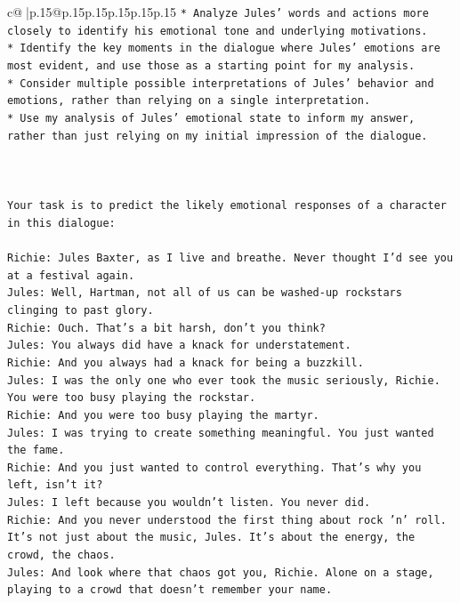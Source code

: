 \documentclass{article}
\begin{document}
{\begin{supertabular}{c@{$\;$}|p{.15\linewidth}@{}p{.15\linewidth}p{.15\linewidth}p{.15\linewidth}p{.15\linewidth}p{.15\linewidth}}
{{{\texttt{* Analyze Jules' words and actions more closely to identify his emotional tone and underlying motivations.} \\
\texttt{* Identify the key moments in the dialogue where Jules' emotions are most evident, and use those as a starting point for my analysis.} \\
\texttt{* Consider multiple possible interpretations of Jules' behavior and emotions, rather than relying on a single interpretation.} \\
\texttt{* Use my analysis of Jules' emotional state to inform my answer, rather than just relying on my initial impression of the dialogue.} \\
\\ 
\\ 
\\ 
\texttt{Your task is to predict the likely emotional responses of a character in this dialogue:} \\
\\ 
\texttt{Richie: Jules Baxter, as I live and breathe. Never thought I'd see you at a festival again.} \\
\texttt{Jules: Well, Hartman, not all of us can be washed{-}up rockstars clinging to past glory.} \\
\texttt{Richie: Ouch. That's a bit harsh, don't you think?} \\
\texttt{Jules: You always did have a knack for understatement.} \\
\texttt{Richie: And you always had a knack for being a buzzkill. } \\
\texttt{Jules: I was the only one who ever took the music seriously, Richie. You were too busy playing the rockstar.} \\
\texttt{Richie: And you were too busy playing the martyr. } \\
\texttt{Jules: I was trying to create something meaningful. You just wanted the fame.} \\
\texttt{Richie: And you just wanted to control everything. That's why you left, isn't it?} \\
\texttt{Jules: I left because you wouldn’t listen. You never did.} \\
\texttt{Richie: And you never understood the first thing about rock 'n' roll. It's not just about the music, Jules. It's about the energy, the crowd, the chaos.} \\
\texttt{Jules: And look where that chaos got you, Richie. Alone on a stage, playing to a crowd that doesn't remember your name.} \\
}}}
\end{supertabular}}
\end{document}

